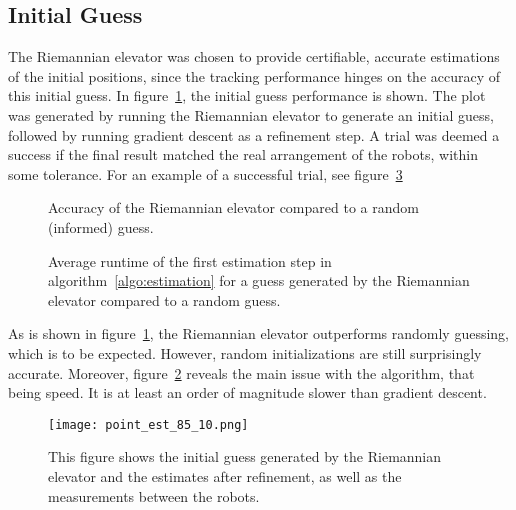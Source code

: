 \subsection{Initial Guess}
The Riemannian elevator was chosen to provide certifiable, accurate estimations of the initial positions, since the tracking performance hinges on the accuracy of this initial guess. In figure~\ref{fig:accuracy-comp}, the initial guess performance is shown. The plot was generated by running the Riemannian elevator to generate an initial guess, followed by running gradient descent as a refinement step. A trial was deemed a success if the final result matched the real arrangement of the robots, within some tolerance. For an example of a successful trial, see figure~\ref{fig:init-ex}
\begin{figure}[ht]
    \centering
    
    \caption{Accuracy of the Riemannian elevator compared to a random (informed) guess.}
    \label{fig:accuracy-comp}
\end{figure}
\begin{figure}[ht]
    \centering
    
    \caption{Average runtime of the first estimation step in algorithm~\ref{algo:estimation} for a guess generated by the Riemannian elevator compared to a random guess.}
    \label{fig:speed-comp}
\end{figure}
As is shown in figure~\ref{fig:accuracy-comp}, the Riemannian elevator outperforms randomly guessing, which is to be expected. However, random initializations are still surprisingly accurate. Moreover, figure~\ref{fig:speed-comp} reveals the main issue with the algorithm, that being speed. It is at least an order of magnitude slower than gradient descent. 
\begin{figure}[ht]
    \centering
    \texttt{[image: point\_est\_85\_10.png]}
    \caption{This figure shows the initial guess generated by the Riemannian elevator and the estimates after refinement, as well as the measurements between the robots.}
    \label{fig:init-ex}
\end{figure}

